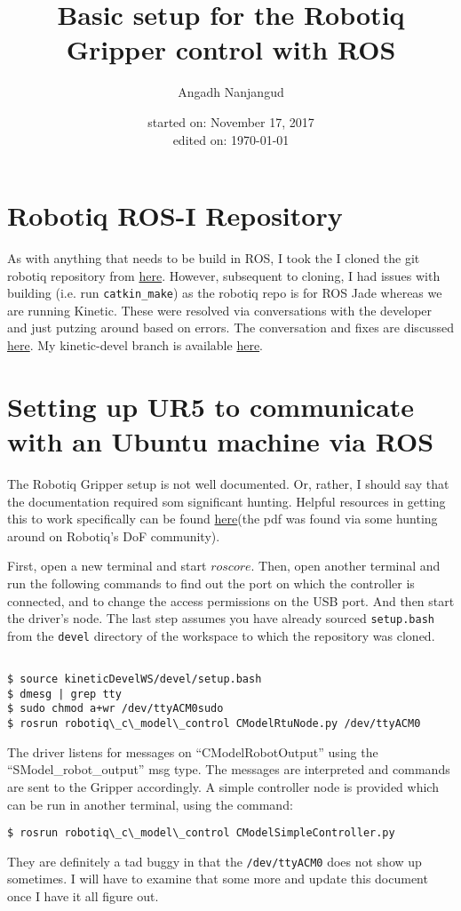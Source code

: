 \documentclass[a4paper]{article}
\title{Basic setup for the Robotiq Gripper control
with ROS}
\author{Angadh Nanjangud}
\date{started on: November 17, 2017\\ edited on: \today}
\begin{document}
\maketitle

\section{Robotiq ROS-I Repository}
As with anything that needs to be build in ROS, I took the 
I cloned the git robotiq repository from
\href{https://github.com/ros-industrial/robotiq}{here}.
However, subsequent to cloning, I had issues with building
(i.e. run \texttt{catkin\_make}) as the robotiq repo is for
ROS Jade whereas we are running Kinetic. These were resolved
via conversations with the developer and just putzing around
based on errors. The conversation and fixes are discussed
\href{https://github.com/ros-industrial/robotiq/issues/116}
{here}. My kinetic-devel branch is available
\href{https://github.com/angadhn/robotiq/tree/kinetic-devel}
{here}.

\section{Setting up UR5 to communicate with an Ubuntu machine
via  ROS}
The Robotiq Gripper setup is not well documented. Or, rather,
I should say that the documentation required som significant
hunting. Helpful resources in getting this to work specifically
can be found
\href{https://us.v-cdn.net/6027406/uploads/editor/g9/o29lnir20s3t.pdf}
{here}(the pdf was found via some hunting around on
Robotiq's DoF community).

First, open a new terminal and start $roscore$.
Then, open another terminal and run the following commands 
to find out the port on which the controller is connected,
and to change the access permissions on the USB port. And
then start the driver's node. The last step assumes you have
already sourced \texttt{setup.bash} from the \texttt{devel}
directory of the workspace to which the repository was cloned.
\begin{lstlisting}

$ source kineticDevelWS/devel/setup.bash
$ dmesg | grep tty
$ sudo chmod a+wr /dev/ttyACM0sudo 
$ rosrun robotiq\_c\_model\_control CModelRtuNode.py /dev/ttyACM0
\end{lstlisting}

The driver listens for messages on ``CModelRobotOutput''
using the ``SModel\_robot\_output'' msg type. The messages
are interpreted and commands are sent to the Gripper accordingly.
A simple controller node is provided which can be run in
another terminal, using the command:
\begin{lstlisting}
$ rosrun robotiq\_c\_model\_control CModelSimpleController.py
\end{lstlisting}
They are definitely a tad buggy in that the
\texttt{/dev/ttyACM0} does not show up sometimes. I will
have to examine that some more and update this document
once I have it all figure out.
\end{document}
